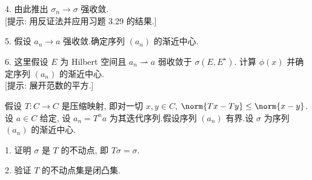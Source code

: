 \begin{problem}
4. 由此推出 $\sigma_n\to\sigma$ 强收敛.\\
{[提示: 用反证法并应用习题 3.29 的结果.]}

5. 假设 $a_n\to a$ 强收敛.确定序列 $(a_n)$ 的渐近中心.

6. 这里假设 $E$ 为 Hilbert 空间且 $a_n\rightharpoonup a$ 弱收敛于 $\sigma(E,E^\star)$.
计算 $\phi(x)$ 并确定序列 $(a_n)$ 的渐近中心.\\
{[提示: 展开范数的平方.]}


假设 $T:C\to C$ 是压缩映射, 即对一切 $x,y\in C$, $\norm{Tx-Ty}\le\norm{x-y}$.
设 $a\in C$ 给定, 设 $a_n=T^na$ 为其迭代序列.假设序列 $(a_n)$ 有界.设 $\sigma$
为序列 $(a_n)$ 的渐近中心.

1. 证明 $\sigma$ 是 $T$ 的不动点, 即 $T\sigma=\sigma$.

2. 验证 $T$ 的不动点集是闭凸集.
\end{problem}
